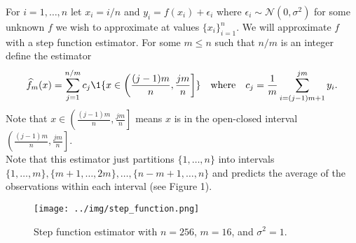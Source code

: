 \documentclass{article}
\begin{document}
\begin{bprob}
    For $i=1,\dots,n$ let $x_i = i/n$ and $y_i = f(x_i) + \epsilon_i$ where $\epsilon_i \sim \mathcal{N}(0,\sigma^2)$ for some unknown $f$ we wish to approximate at values $\{x_i\}_{i=1}^n$. We will approximate $f$ with a step function estimator. For some $m \leq n$ such that $n/m$ is an integer define the estimator
    \begin{align*}
        \widehat{f}_m(x) = \sum_{j=1}^{n/m} c_j {{\1\{ x \in \left( \frac{(j-1)m}{n}, \frac{jm}{n}\right] \}}} \quad\text{where}\quad c_j = \frac{1}{m} \sum_{i=(j-1)m + 1}^{jm} y_i.
    \end{align*}
    Note that $x \in \left( \frac{(j-1)m}{n}, \frac{jm}{n}\right]$ means $x$ is in the open-closed interval $\left( \frac{(j-1)m}{n}, \frac{jm}{n}\right]$. \\
    \break
    Note that this estimator just partitions $\{1,\dots,n\}$ into intervals $\{1,\dots,m\},\{m+1,\dots,2m\}, \dots,\{n-m+1,\dots,n\}$ and predicts the average of the observations within each interval (see Figure 1).
    
    \begin{figure}[H]
        \centering
        \texttt{[image: ../img/step\_function.png]}
        \caption{Step function estimator with $n=256$, $m=16$, and $\sigma^2=1$.}
    \end{figure}
    

\end{bprob}
\end{document}
